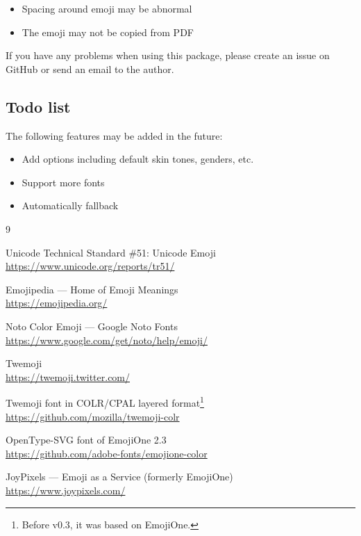 \documentclass{l3doc}
\newcounter { emoji }
\begin{document}
\begin{itemize}
  \item Spacing around emoji may be abnormal
  \item The emoji may not be copied from PDF
\end{itemize}

If you have any problems when using this package, please create an issue on GitHub or send
an email to the author.

\subsection{ Todo list}

The following features may be added in the future:

\begin{itemize}
  \item Add options including default skin tones, genders, etc.
  \item Support more fonts
  \item Automatically fallback
\end{itemize}

\begin{thebibliography}{9}
  \def\newblock{\\}
  \small

  Unicode\textregistered{} Technical Standard \#51: Unicode Emoji
  \newblock \url{https://www.unicode.org/reports/tr51/}

   Emojipedia ---  Home of Emoji Meanings
  \newblock \url{https://emojipedia.org/}

  Noto Color Emoji --- Google Noto Fonts
  \newblock \url{https://www.google.com/get/noto/help/emoji/}

  Twemoji
  \newblock \url{https://twemoji.twitter.com/}

  Twemoji font in COLR/CPAL layered format\footnote{Before v0.3, it was based on EmojiOne.}
  \newblock \url{https://github.com/mozilla/twemoji-colr}

  OpenType-SVG font of EmojiOne 2.3
  \newblock \url{https://github.com/adobe-fonts/emojione-color}

  JoyPixels\texttrademark{} --- Emoji as a Service (formerly EmojiOne)
  \newblock \url{https://www.joypixels.com/}
\end{thebibliography}
\end{document}
